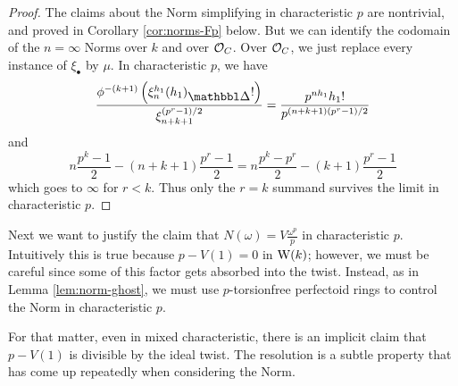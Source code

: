 \begin{proof}
  The claims about the Norm simplifying in characteristic $p$ are nontrivial, and proved in Corollary \ref{cor:norms-Fp} below. But we can identify the codomain of the $n=\infty$ Norms over $k$ and over $\mathcal O_C$. Over $\mathcal O_C$, we just replace every instance of $\xi_\bullet$ by $\mu$. In characteristic $p$, we have
  \[
    \frac{\phi^{-(k+1)}\left(\xi_n^{h_1} (h_1)_\prism!\right)}{\xi_{n+k+1}^{(p^r-1)/2}}
    =
    \frac{p^{nh_1} h_1!}{p^{(n+k+1)(p^r-1)/2}}
  \]
  and
  \[ n\frac{p^k-1}2 - (n+k+1)\frac{p^r-1}2 = n\frac{p^k - p^r}2 - (k+1)\frac{p^r-1}2 \]
  which goes to $\infty$ for $r<k$. Thus only the $r=k$ summand survives the limit in characteristic $p$.
\end{proof}

Next we want to justify the claim that $N(\omega)=V\frac{\omega^p}p$ in characteristic $p$. Intuitively this is true because $p-V(1)=0$ in $\mathrm W(k)$; however, we must be careful since some of this factor gets absorbed into the twist. Instead, as in Lemma \ref{lem:norm-ghost}, we must use $p$-torsionfree perfectoid rings to control the Norm in characteristic $p$.

For that matter, even in mixed characteristic, there is an implicit claim that $p-V(1)$ is divisible by the ideal twist. The resolution is a subtle property that has come up repeatedly when considering the Norm.

